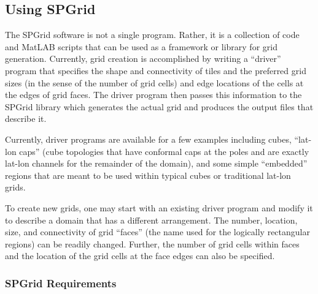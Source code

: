\subsection{Using SPGrid}

The SPGrid software is not a single program.  Rather, it is a
collection of \CC code and MatLAB scripts that can be used as a
framework or library for grid generation.  Currently, grid creation is
accomplished by writing a \CC ``driver'' program that specifies the
shape and connectivity of tiles and the preferred grid sizes (in the
sense of the number of grid cells) and edge locations of the cells at
the edges of grid faces.  The driver program then passes this
information to the SPGrid library which generates the actual grid and
produces the output files that describe it.

Currently, driver programs are available for a few examples including
cubes, ``lat-lon caps'' (cube topologies that have conformal caps at
the poles and are exactly lat-lon channels for the remainder of the
domain), and some simple ``embedded'' regions that are meant to be
used within typical cubes or traditional lat-lon grids.

To create new grids, one may start with an existing driver program and
modify it to describe a domain that has a different arrangement.  The
number, location, size, and connectivity of grid ``faces'' (the name
used for the logically rectangular regions) can be readily changed.
Further, the number of grid cells within faces and the location of
the grid cells at the face edges can also be specified.


\subsubsection{SPGrid Requirements}

